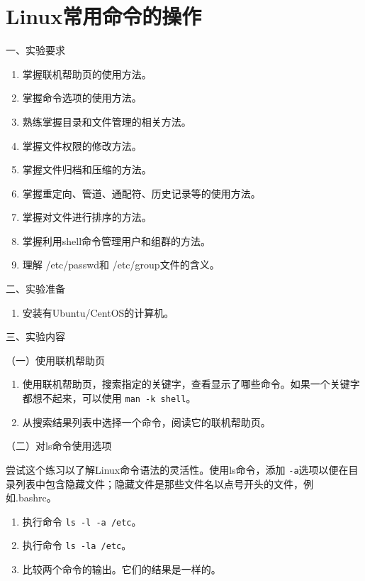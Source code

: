 \chapter{Linux常用命令的操作}

\noindent
一、实验要求
\begin{enumerate}
  \item 掌握联机帮助页的使用方法。
  \item 掌握命令选项的使用方法。
  \item 熟练掌握目录和文件管理的相关方法。
  \item 掌握文件权限的修改方法。
  \item 掌握文件归档和压缩的方法。
  \item 掌握重定向、管道、通配符、历史记录等的使用方法。
  \item 掌握对文件进行排序的方法。
  \item 掌握利用shell命令管理用户和组群的方法。
  \item 理解 /etc/passwd和 /etc/group文件的含义。
\end{enumerate}

\vspace{0.2in}
\noindent
二、实验准备
\begin{enumerate}
  \item 安装有Ubuntu/CentOS的计算机。
\end{enumerate}

\vspace{0.2in}
\noindent
三、实验内容

\vspace{0.1in}
（一）使用联机帮助页
\begin{enumerate}
  \item 使用联机帮助页，搜索指定的关键字，查看显示了哪些命令。如果一个关键字都想不起来，可以使用 \verb|man -k shell|。
  \item 从搜索结果列表中选择一个命令，阅读它的联机帮助页。
\end{enumerate}

\vspace{0.1in}
（二）对ls命令使用选项

尝试这个练习以了解Linux命令语法的灵活性。使用ls命令，添加 \verb|-a|选项以便在目录列表中包含隐藏文件；隐藏文件是那些文件名以点号开头的文件，例如.bashrc。
\begin{enumerate}
  \item 执行命令 \verb|ls -l -a /etc|。
  \item 执行命令 \verb|ls -la /etc|。
  \item 比较两个命令的输出。它们的结果是一样的。
\end{enumerate}

